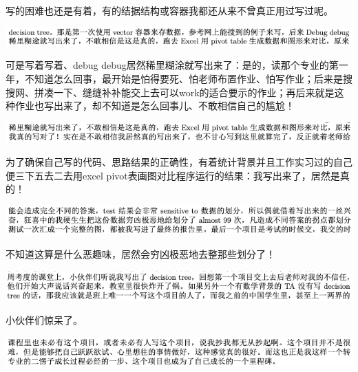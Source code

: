 \documentclass[9pt, b5paper]{article}
\begin{document}
写的困难也还是有着，有的结据结构或容器我都还从来不曾真正用过写过呢。 

\begin{center}
\includegraphics[width=.9\linewidth]{./pic/backups_plans_20210504_115241.png}
\end{center}

可是写着写着、debug debug居然稀里糊涂就写出来了：是的，读那个专业的第一年，不知道怎么回事，最开始是怕得要死、怕老师布置作业、怕写作业；后来是搜搜网、拼凑一下、缝缝补补能交上去可以work的适合要示的作业；再后来就是这种作业也写出来了，却不知道是怎么回事儿、不敢相信自己的尴尬！

\begin{center}
\includegraphics[width=.9\linewidth]{./pic/backups_plans_20210504_115408.png}
\end{center}

为了确保自己写的代码、思路结果的正确性，有着统计背景并且工作实习过的自己便三下五去二去用excel pivot表画图对比程序运行的结果：我写出来了，居然是真的！

\begin{center}
\includegraphics[width=.9\linewidth]{./pic/backups_plans_20210504_115700.png}
\end{center}

不知道这算是什么恶趣味，居然会穷凶极恶地去整那些划分了！　

\begin{center}
\includegraphics[width=.9\linewidth]{./pic/backups_plans_20210504_115836.png}
\end{center}

小伙伴们惊呆了。

\begin{center}
\includegraphics[width=.9\linewidth]{./pic/backups_plans_20210504_115915.png}
\end{center}
\end{document}
